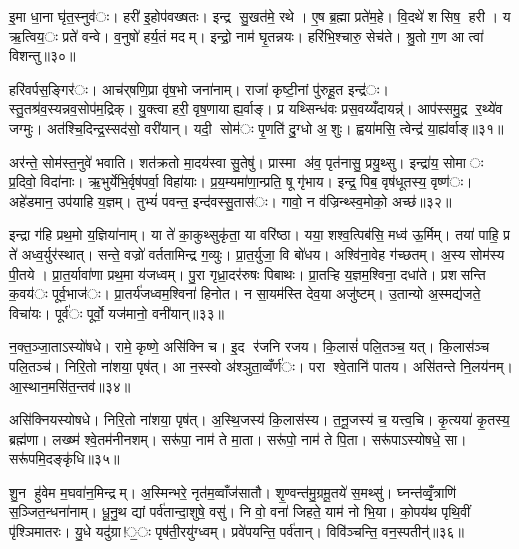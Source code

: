 इ॒मा धा॒ना घृ॑त॒स्नुव॑ः। हरी॑ इ॒होप॑वख्षतः। इन्द्र सु॒खत॑मे॒ रथे। ए॒ष ब्र॒ह्मा प्रते॑म॒हे। वि॒दथे॑ शसिष॒ हरी। य ऋ॒त्विय॒ः प्रते॑ वन्वे। व॒नुषो॑ हर्य॒तं मदम्। इन्द्रो॒ नाम॑ घृ॒तन्नयः। हरि॑भि॒श्चारु॒ सेच॑ते। श्रु॒तो ग॒ण आ त्वा॑ विशन्तु॥३०॥

हरि॑वर्पस॒ङ्गिर॑ः। आच॑र्‌षणि॒प्रा वृ॑ष॒भो जना॑नाम्। राजा॑ कृष्टी॒नां पु॑रुहू॒त इन्द्र॑ः। स्तु॒तश्र॑व॒स्यन्नव॒सोप॑म॒द्रिक्। यु॒क्त्वा हरी॒ वृष॒णायाह्य॒र्वाङ्। प्र यथ्सिन्ध॑वः प्रस॒वय्यँदायन्न्॑। आप॑स्समु॒द्र र॒थ्ये॑व जग्मुः। अत॑श्चि॒दिन्द्र॒स्सद॑सो॒ वरी॑यान्। यदी॒ सोम॑ः पृ॒णति॑ दु॒ग्धो अ॒शुः। ह्वया॑मसि॒ त्वेन्द्र॑ या॒ह्य॑र्वाङ्॥३१॥

अर॑न्ते॒ सोम॑स्त॒नुवे॑ भवाति। शत॑क्रतो मा॒दय॑स्वा सु॒तेषु॑। प्रास्मा अ॑व॒ पृत॑नासु॒ प्रयु॒थ्सु। इन्द्रा॑य॒ सोमाः प्र॒दिवो॒ विदा॑नाः। ऋ॒भुर्येभि॒र्वृष॑पर्वा॒ विहा॑याः। प्र॒य॒म्यमा॑णा॒न्प्रति॒ षू गृ॑भाय। इन्द्र॒ पिब॒ वृष॑धूतस्य॒ वृष्ण॑ः। अहे॑डमान॒ उप॑याहि य॒ज्ञम्। तुभ्यं॑ पवन्त॒ इन्द॑वस्सु॒तास॑ः। गावो॒ न व॑ज्रिन्थ्स्व॒मोको॒ अच्छ॑॥३२॥

इन्द्रा ग॑हि प्रथ॒मो य॒ज्ञिया॑नाम्। या ते॑ का॒कुथ्सुकृ॑ता॒ या वरि॑ष्ठा। यया॒ शश्व॒त्पिब॑सि॒ मध्व॑ ऊ॒र्मिम्। तया॑ पाहि॒ प्र ते॑ अध्व॒र्युर॑स्थात्। सन्ते॒ वज्रो॑ वर्ततामिन्द्र ग॒व्युः। प्रा॒त॒र्युजा॒ वि बो॑धय। अश्वि॑ना॒वेह ग॑च्छतम्। अ॒स्य सोम॑स्य पी॒तये। प्रा॒त॒र्यावा॑णा प्रथ॒मा य॑जध्वम्। पु॒रा गृध्रा॒दर॑रुषः पिबाथः। प्रा॒तऱ्हि य॒ज्ञम॒श्विना॒ दधा॑ते। प्रशसन्ति क॒वय॑ः पूर्व॒भाज॑ः। प्रा॒तर्य॑जध्वम॒श्विना॑ हिनोत। न सा॒यम॑स्ति देव॒या अजु॑ष्टम्। उ॒तान्यो अ॒स्मद्य॑जते॒ विचा॑यः। पूर्व॑ः पूर्वो॒ यज॑मानो॒ वनी॑यान्॥३३॥


न॒क्त॒ञ्जा॒ताऽस्यो॑षधे। रामे॒ कृष्णे॒ असि॑क्नि च। इ॒द र॑जनि रजय। कि॒लासं॑ पलि॒तञ्च॒ यत्। कि॒लास॑ञ्च पलि॒तञ्च॑। निरि॒तो ना॑शया॒ पृष॑त्। आ न॒स्स्वो अ॑श्ञुता॒व्वँर्ण॑ः। परा श्वे॒तानि॑ पातय। असि॑तन्ते नि॒लय॑नम्। आ॒स्थान॒मसि॑त॒न्तव॑॥३४॥

असि॑क्नियस्योषधे। निरि॒तो ना॑शया॒ पृष॑त्। अ॒स्थि॒जस्य॑ कि॒लास॑स्य। त॒नू॒जस्य॑ च॒ यत्त्व॒चि। कृ॒त्यया॑ कृ॒तस्य॒ ब्रह्म॑णा। लख्ष्म॑ श्वे॒तम॑नीनशम्। सरू॑पा॒ नाम॑ ते मा॒ता। सरू॑पो॒ नाम॑ ते पि॒ता। सरू॑पाऽस्योषधे॒ सा। सरू॑पमि॒दङ्कृ॑धि॥३५॥

शु॒न हु॑वेम म॒घवा॑न॒मिन्द्रम्। अ॒स्मिन्भरे॒ नृत॑म॒व्वाँज॑सातौ। शृ॒ण्वन्त॑मु॒ग्रमू॒तये॑ स॒मथ्सु॑। घ्नन्त॑व्वृँ॒त्राणि॑ स॒ञ्जित॒न्धना॑नाम्। धू॒नु॒थ द्यां पर्व॑तान्दा॒शुषे॒ वसु॑। नि वो॒ वना॑ जिहते॒ याम॑ नो भि॒या। को॒पय॑थ पृथि॒वीं पृ॑श्ञिमातरः। यु॒धे यदु॑ग्रा!॒ः पृष॑ती॒रयु॑ग्ध्वम्। प्रवे॑पयन्ति॒ पर्व॑तान्। विवि॑ञ्चन्ति॒ वन॒स्पतीन्॑॥३६॥

